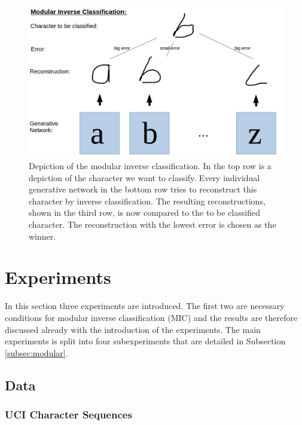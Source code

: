 \documentclass{article}
\begin{document}
\begin{figure}[!htb]
	\centering
	\includegraphics[width=\textwidth]{images/modular_inverse_classification.png}
	\caption{Depiction of the modular inverse classification. In the top row is a depiction of the character we want to classify. Every individual generative network in the bottom row tries to reconstruct this character by inverse classification. The resulting reconstructions, shown in the third row, is now compared to the to be classified character. The reconstruction with the lowest error is chosen as the winner.}
	\label{fig:modular_inverse_classification}
\end{figure}

\section{Experiments}

In this section three experiments are introduced. The first two are necessary conditions for modular inverse classification (MIC) and the results are therefore discussed already with the introduction of the experiments. The main experiments is split into four subexperiments that are detailed in Subsection \ref{subsec:modular}.


\subsection{Data}
\label{subsec:data}

\subsubsection{UCI Character Sequences}
\end{document}
